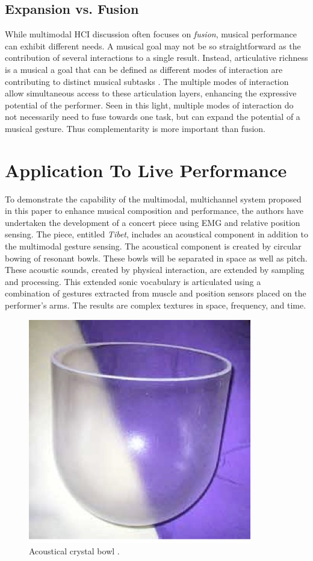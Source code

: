 \subsection{Expansion vs. Fusion}


While multimodal HCI discussion often focuses on \textit{fusion}, musical performance can exhibit different needs. A musical goal may not be so straightforward as the contribution of several interactions to a single result. Instead, articulative richness is a musical a goal that can be defined as different modes of interaction are contributing to distinct musical subtasks \cite{Tanaka:2001a}. The multiple modes of interaction allow simultaneous access to these articulation layers, enhancing the expressive potential of the performer. Seen in this light, multiple modes of interaction do not necessarily need to fuse towards one task, but can expand the potential of a musical gesture.  Thus complementarity is more important than fusion. 

\section{Application To Live Performance}


To demonstrate the capability of the multimodal, multichannel system proposed in this paper to enhance musical composition and performance, the authors have undertaken the development of a concert piece using EMG and relative position sensing. The piece, entitled \textit{Tibet}, includes an acoustical component in addition to the multimodal gesture sensing.  The acoustical component is created by circular bowing of resonant bowls. These bowls will be separated in space as well as pitch. These acoustic sounds, created by physical interaction, are extended by sampling and processing. This extended sonic vocabulary is articulated using a combination of gestures extracted from muscle and position sensors placed on the performer's arms. The results are complex textures in space, frequency, and time.  

  \begin{figure}[!htbp]
  \centering
  \includegraphics[scale=0.5]{figures/bowl.jpg}
  \caption{Acoustical crystal bowl .}
  \label{Tanaka:fig:crystalbowl}
\end{figure}

